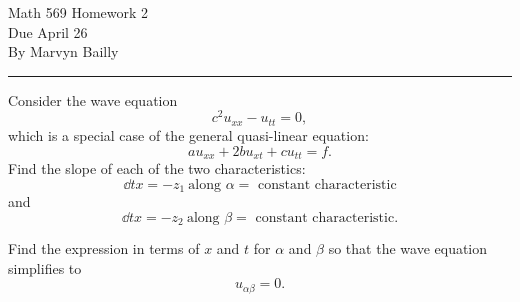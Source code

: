 \documentclass[12pt]{report}
\begin{document}
\large

\begin{center}
 Math 569 Homework 2\\
 Due April 26\\
 By Marvyn Bailly\\
\end{center}

\normalsize

\hrule



\begin{problem}
    Consider the wave equation
    \[ 
        c^2 u_{xx} - u_{tt} = 0,
    \]
    which is a special case of the general quasi-linear equation:
    \[ 
        a u_{xx} + 2bu_{xt} + cu_{tt} = f.
    \]
    Find the slope of each of the two characteristics:
    \[ 
        \dd{t}{x} = -z_1 ~\text{along $\alpha = $ constant characteristic}
    \]
    and
    \[ 
        \dd{t}{x} = -z_2 ~\text{along $\beta = $ constant characteristic.}
    \]

    Find the expression in terms of $x$ and $t$ for $\alpha$ and $\beta$ so that the wave equation simplifies to 
    \[ 
        u_{\alpha \beta} = 0.
    \]
    
\end{problem}
\end{document}
